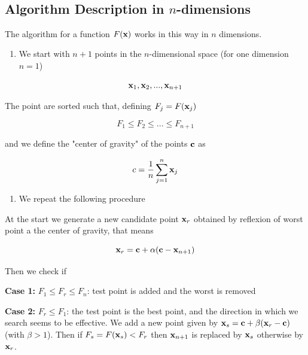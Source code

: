 \documentclass[11pt]{article}
\providecommand{\tightlist}{%
      \setlength{\itemsep}{0pt}\setlength{\parskip}{0pt}}
\begin{document}
    \begin{center}
    \end{center}
    { \hspace*{\fill} \\}
    
    \subsection{\texorpdfstring{Algorithm Description in
\(n\)-dimensions}{Algorithm Description in n-dimensions}}\label{algorithm-description-in-n-dimensions}

    The algorithm for a function \(F({\bf x})\) works in this way in \(n\)
dimensions.

\begin{enumerate}
\def\labelenumi{\arabic{enumi}.}
\tightlist
\item
  We start with \(n+1\) points in the \(n\)-dimensional space (for one
  dimension \(n=1\))
\end{enumerate}

\[
{\bf x}_1,{\bf x}_2,..., {\bf x}_{n+1}
\]

The point are sorted such that, defining \(F_j = F({\bf x}_j)\)

\[
F_1 \leq F_2 \leq ... \leq F_{n+1}
\]

and we define the "center of gravity" of the points \({\bf c}\) as

\[
c=\frac{1}{n} \sum_{j=1}^n {\bf x}_j
\]

\begin{enumerate}
\def\labelenumi{\arabic{enumi}.}
\setcounter{enumi}{1}
\tightlist
\item
  We repeat the following procedure
\end{enumerate}

At the start we generate a new candidate point \({\bf x}_r\) obtained by
reflexion of worst point a the center of gravity, that means

\[
{\bf x}_r = {\bf c}+\alpha({\bf c}-{\bf x}_{n+1})
\]

Then we check if

\textbf{Case 1:} \(F_1 \leq F_r \leq F_n\): test point is added and the
worst is removed

\textbf{Case 2:} \(F_r \leq F_1\): the test point is the best point, and
the direction in which we search seems to be effective. We add a new
point given by \({\bf x}_s = {\bf c}+\beta ({\bf x}_r-{\bf c})\) (with
\(\beta > 1\)). Then if \(F_s=F({\bf x}_s)<F_r\) then \({\bf x}_{n+1}\)
is replaced by \({\bf x}_s\) otherwise by \({\bf x}_r\).
\end{document}
